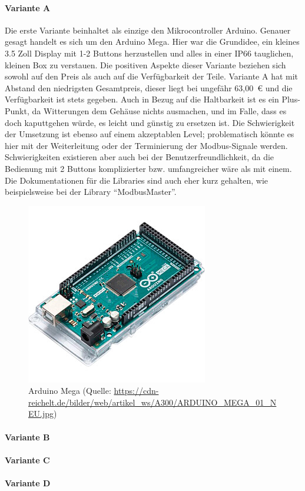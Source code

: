 \paragraph{Variante A}
Die erste Variante beinhaltet als einzige den Mikrocontroller Arduino. Genauer gesagt handelt es sich um den Arduino Mega. Hier war die Grundidee, ein kleines 3.5 Zoll Display mit 1-2 Buttons herzustellen und alles in einer IP66 tauglichen, kleinen Box zu verstauen. 
Die positiven Aspekte dieser Variante beziehen sich sowohl auf den Preis als auch auf die Verfügbarkeit der Teile. Variante A hat mit Abstand den niedrigsten Gesamtpreis, dieser liegt bei ungefähr 63,00 € und die Verfügbarkeit ist stets gegeben. Auch in Bezug auf die Haltbarkeit ist es ein Plus-Punkt, da Witterungen dem Gehäuse nichts ausmachen, und im Falle, dass es doch kaputtgehen würde, es leicht und günstig zu ersetzen ist. Die Schwierigkeit der Umsetzung ist ebenso auf einem akzeptablen Level; problematisch könnte es hier mit der Weiterleitung oder der Terminierung der Modbus-Signale werden. Schwierigkeiten existieren aber auch bei der Benutzerfreundlichkeit, da die Bedienung mit 2 Buttons komplizierter bzw. umfangreicher wäre als mit einem. Die Dokumentationen für die Libraries sind auch eher kurz gehalten, wie beispielsweise bei der Library \enquote{ModbusMaster}.
\begin{figure}[ht]
	\centering
	\includegraphics[width=0.5\linewidth]{Bilder/ARDUINO_MEGA.jpg}
	\caption{Arduino Mega (Quelle: \url{https://cdn-reichelt.de/bilder/web/artikel_ws/A300/ARDUINO_MEGA_01_NEU.jpg})}
	\label{fig:arduino_mega}
\end{figure}
\paragraph{Variante B}
\paragraph{Variante C}
\paragraph{Variante D}